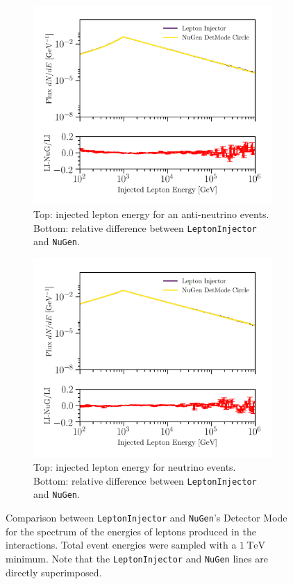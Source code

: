 \documentclass[main.tex]{subfiles}
\newcommand{\LeptonInjector}{\texttt{LeptonInjector}}
\newcommand{\NuGen}{\texttt{NuGen}}
\begin{document}
\begin{figure}
    \centering
    \begin{subfigure}[t]{0.5\linewidth}
    	\centering
        \includegraphics[width=0.85\linewidth]{figures/secondaryE_anti-matter.png}
        \caption{Top: injected lepton energy for an anti-neutrino events.\\Bottom: relative difference between \LeptonInjector{} and \NuGen{}.}
    \end{subfigure}%
    \begin{subfigure}[t]{0.5\linewidth}
    	\centering
        \includegraphics[width=0.85\linewidth]{figures/secondaryE_matter.png}
        \caption{Top: injected lepton energy for neutrino events.\\Bottom: relative difference between \LeptonInjector{} and \NuGen{}.}
    \end{subfigure}
    \caption{Comparison between \LeptonInjector{} and \NuGen{}'s Detector Mode for the spectrum of the energies of leptons produced in the interactions. Total event energies were sampled with a $\SI{1}\TeV$ minimum. Note that the \LeptonInjector{} and \NuGen{} lines are directly superimposed.}\label{fig:secondary_energy}
\end{figure}
\end{document}
